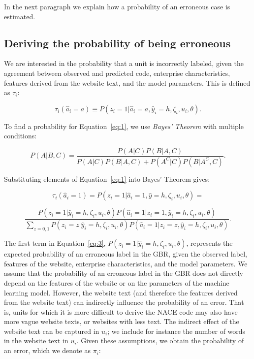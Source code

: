 \documentclass[12pt, a4paper, titlepage]{article}
\begin{document}
In the next paragraph we explain how a probability of an erroneous case is estimated.

					\subsection{Deriving the probability of being erroneous}
					\label{section:probs}

We are interested in the probability that a unit is incorrectly labeled, given the agreement between observed and predicted code, enterprise characteristics, features derived from the website text, and the model parameters. This is defined as $\tau_i$:

						\begin{equation} \label{eq:1}
\tau_i(\hat{a}_i = a) \equiv P(z_i = 1 | \hat{a}_i = a, \hat{y}_i = h, \zeta_i, u_i, \theta).
						\end{equation}

To find a probability for Equation~\ref{eq:1}, we use \textit{Bayes' Theorem} with multiple conditions:

						\begin{equation*} \label{eq:bayes}
P(A | B, C) =  \frac{P(A | C) P(B | A, C)}{P(A|C)P(B|A,C) + P(A^C|C)P(B|A^C, C)}   .
						\end{equation*}

Substituting elements of Equation~\ref{eq:1} into Bayes' Theorem gives: 

						\begin{equation}\label{eq:2}
\tau_i(\hat{a}_i = 1) = P(z_i = 1 | \hat{a}_i = 1, \hat{y} = h, \zeta_i, u_i, \theta) = 
						\end{equation}

						\begin{equation}\label{eq:3}
\frac{P(z_i = 1|\hat{y}_i = h, \zeta_i, u_i, \theta)P(\hat{a}_i=1|z_i=1, \hat{y}_i = h, \zeta_i, u_i, \theta) }
{\sum_{z=0,1}P(z_i=z|\hat{y}_i = h, \zeta_i, u_i, \theta) P( \hat{a}_i=1|z_i=z, \hat{y}_i = h, \zeta_i, u_i, \theta  )} .
						\end{equation}


The first term in Equation~\ref{eq:3}, $P(z_i = 1|\hat{y}_i = h, \zeta_i, u_i, \theta)$, represents the expected probability of an erroneous label in the GBR, given the observed label, features of the website, enterprise characteristics, and the model parameters. We assume that the probability of an erroneous label in the GBR does not directly depend on the features of the website or on the parameters of the machine learning model. However, the website text (and therefore the features derived from the website text) can indirectly influence the probability of an error. That is, units for which it is more difficult to derive the NACE code may also have more vague website texts, or websites with less text. The indirect effect of the website text can be captured in $u_i$; we include for instance the number of words in the website text in $u_i$. Given these assumptions, we obtain the probability of an error, which we denote as $\pi_i$:
\end{document}
